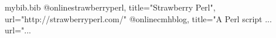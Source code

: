 \begin{filecontents}{mybib.bib}
	@online{strawberryperl,
			title="Strawberry Perl",
			url="http://strawberryperl.com/"}
	@online{cmhblog,
			title="A Perl script ...
			url="...
		}
\end{filecontents}
